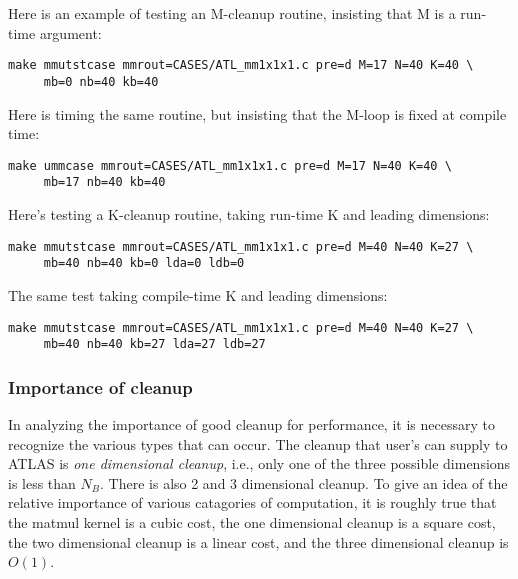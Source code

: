 \documentclass[11pt]{article}
\begin{document}
Here is an example of testing an M-cleanup routine, insisting that
M is a run-time argument:
\begin{verbatim}
make mmutstcase mmrout=CASES/ATL_mm1x1x1.c pre=d M=17 N=40 K=40 \
     mb=0 nb=40 kb=40
\end{verbatim}

Here is timing the same routine, but insisting that the M-loop is fixed at
compile time:
\begin{verbatim}
make ummcase mmrout=CASES/ATL_mm1x1x1.c pre=d M=17 N=40 K=40 \
     mb=17 nb=40 kb=40
\end{verbatim}

Here's testing a K-cleanup routine, taking run-time K and leading dimensions:
\begin{verbatim}
make mmutstcase mmrout=CASES/ATL_mm1x1x1.c pre=d M=40 N=40 K=27 \
     mb=40 nb=40 kb=0 lda=0 ldb=0
\end{verbatim}

The same test taking compile-time K and leading dimensions:
\begin{verbatim}
make mmutstcase mmrout=CASES/ATL_mm1x1x1.c pre=d M=40 N=40 K=27 \
     mb=40 nb=40 kb=27 lda=27 ldb=27
\end{verbatim}

\subsubsection{Importance of cleanup}
\label{sec-cleancost}
In analyzing the importance of good cleanup for performance, it is necessary
to recognize the various types that can occur.  The cleanup that user's can
supply to ATLAS is {\em one dimensional cleanup}, i.e., only one of the three
possible dimensions is less than $N_B$.  There is also 2 and 3 dimensional
cleanup.  To give an idea of the relative importance of various catagories
of computation, it is roughly true that the matmul kernel is a cubic cost,
the one dimensional cleanup is a square cost, the two dimensional cleanup
is a linear cost, and the three dimensional cleanup is $O(1)$.
\end{document}

